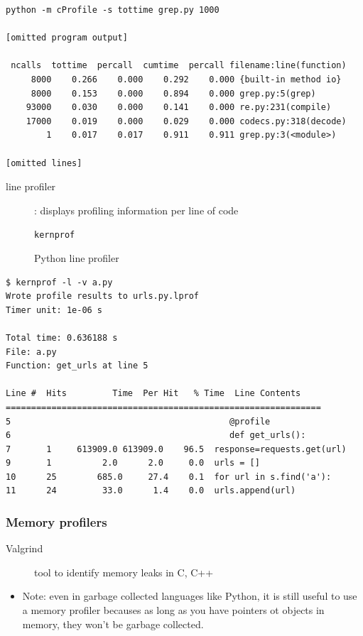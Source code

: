 \documentclass[letterpaper,12pt]{article}
\newcommand*{\lstitem}[1]{
  \setbox0\hbox{\lstinline{#1}}
  \item[\usebox0]
}
\begin{document}
\begin{lstlisting}
python -m cProfile -s tottime grep.py 1000

[omitted program output]

 ncalls  tottime  percall  cumtime  percall filename:line(function)
     8000    0.266    0.000    0.292    0.000 {built-in method io}
     8000    0.153    0.000    0.894    0.000 grep.py:5(grep)
    93000    0.030    0.000    0.141    0.000 re.py:231(compile)
    17000    0.019    0.000    0.029    0.000 codecs.py:318(decode)
        1    0.017    0.017    0.911    0.911 grep.py:3(<module>)

[omitted lines]
\end{lstlisting}

\begin{description}
 \item[line profiler]: displays profiling information per line of code
       \lstitem{kernprof} Python line profiler
\end{description}

\begin{lstlisting}
$ kernprof -l -v a.py
Wrote profile results to urls.py.lprof
Timer unit: 1e-06 s

Total time: 0.636188 s
File: a.py
Function: get_urls at line 5

Line #  Hits         Time  Per Hit   % Time  Line Contents
==============================================================
5                                           @profile
6                                           def get_urls():
7       1     613909.0 613909.0    96.5  response=requests.get(url)
9       1          2.0      2.0     0.0  urls = []
10      25        685.0     27.4    0.1  for url in s.find('a'):
11      24         33.0      1.4    0.0  urls.append(url)
\end{lstlisting}

\subsubsection{Memory profilers}
\begin{description}
 \item[Valgrind] tool to identify memory leaks in C, C++
\end{description}

\begin{itemize}
 \item Note: even in garbage collected languages like Python, it is still useful to use a memory profiler becauses as long as you have pointers ot objects in memory, they won't be garbage collected.
\end{itemize}
\end{document}
